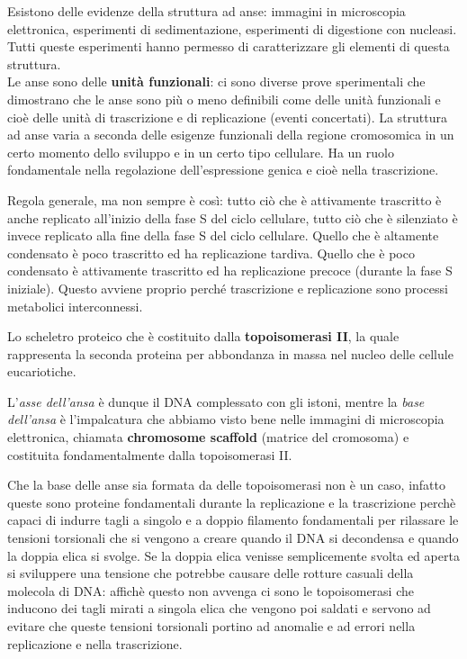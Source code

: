 \documentclass[11pt]{book}
\begin{document}
Esistono delle evidenze della struttura ad anse: immagini in microscopia elettronica, esperimenti di sedimentazione, esperimenti di digestione con nucleasi. Tutti queste esperimenti hanno permesso di caratterizzare gli elementi di questa struttura.\\
Le anse sono delle \textbf{unità funzionali}: ci sono diverse prove sperimentali che dimostrano che le anse sono più o meno definibili come delle unità funzionali e cioè delle unità di trascrizione e di replicazione (eventi concertati). 
La struttura ad anse varia a seconda delle esigenze funzionali della regione cromosomica in un certo momento dello sviluppo e in un certo tipo cellulare. Ha un ruolo fondamentale nella regolazione dell’espressione genica e cioè nella trascrizione.

Regola generale, ma non sempre è così: tutto ciò che è attivamente trascritto è anche replicato all’inizio della fase S del ciclo cellulare, tutto ciò che è silenziato è invece replicato alla fine della fase S del ciclo cellulare.
Quello che è altamente condensato è poco trascritto ed ha replicazione tardiva. Quello che è poco condensato è attivamente trascritto ed ha replicazione precoce (durante la fase S iniziale). Questo avviene proprio perché trascrizione e replicazione sono processi metabolici interconnessi.

Lo scheletro proteico che è costituito dalla \textbf{topoisomerasi II}, la quale rappresenta la seconda proteina per abbondanza in massa nel nucleo delle cellule eucariotiche.

L’\emph{asse dell’ansa} è dunque il DNA complessato con gli istoni, mentre la \emph{base dell’ansa} è l’impalcatura che abbiamo visto bene nelle immagini di microscopia elettronica, chiamata \textbf{chromosome scaffold} (matrice del cromosoma) e costituita fondamentalmente dalla topoisomerasi II.

Che la base delle anse sia formata da delle topoisomerasi non è un caso, infatto queste sono proteine fondamentali durante la replicazione e la trascrizione perchè capaci di indurre tagli a singolo e a doppio filamento fondamentali per rilassare le tensioni torsionali che si vengono a creare quando il DNA si decondensa e quando la doppia elica si svolge. Se la doppia elica venisse semplicemente svolta ed aperta si sviluppere una tensione che potrebbe causare delle rotture casuali della molecola di DNA: affichè questo non avvenga ci sono le topoisomerasi che inducono dei tagli mirati a singola elica che vengono poi saldati e servono ad evitare che queste tensioni torsionali portino ad anomalie e ad errori nella replicazione e nella trascrizione.
\end{document}
